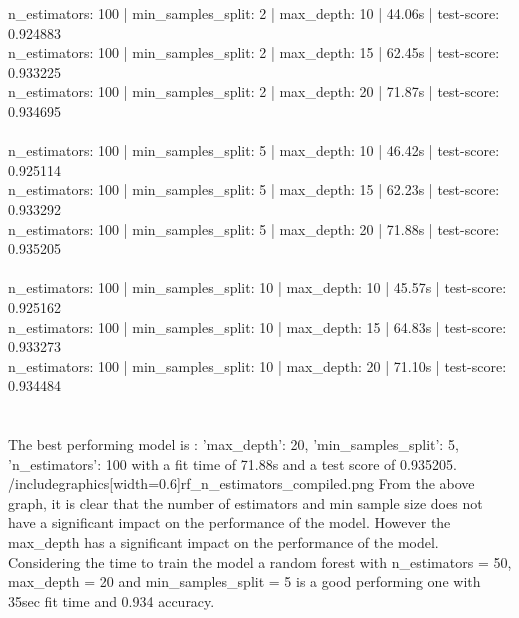 \documentclass[12pt, letterpaper]{article}
\begin{document}
n_estimators: 100 | min_samples_split: 2 | max_depth: 10 | 44.06s | test-score: 0.924883 \\
n_estimators: 100 | min_samples_split: 2 | max_depth: 15 | 62.45s | test-score: 0.933225 \\
n_estimators: 100 | min_samples_split: 2 | max_depth: 20 | 71.87s | test-score: 0.934695 \\ \\
n_estimators: 100 | min_samples_split: 5 | max_depth: 10 | 46.42s | test-score: 0.925114 \\
n_estimators: 100 | min_samples_split: 5 | max_depth: 15 | 62.23s | test-score: 0.933292 \\
n_estimators: 100 | min_samples_split: 5 | max_depth: 20 | 71.88s | test-score: 0.935205 \\ \\
n_estimators: 100 | min_samples_split: 10 | max_depth: 10 | 45.57s | test-score: 0.925162 \\
n_estimators: 100 | min_samples_split: 10 | max_depth: 15 | 64.83s | test-score: 0.933273 \\
n_estimators: 100 | min_samples_split: 10 | max_depth: 20 | 71.10s | test-score: 0.934484 \\ \\ \\

The best performing model is : {'max_depth': 20, 'min_samples_split': 5, 'n_estimators': 100} with a fit time of 71.88s and a test score of 0.935205.
/includegraphics[width=0.6\textwidth]{rf_n_estimators_compiled.png}
From the above graph, it is clear that the number of estimators and min sample size does not have a significant impact on the performance of the model. 
However the max_depth has a significant impact on the performance of the model. \\ 
Considering the time to train the model a random forest with n_estimators = 50, max_depth = 20 and min_samples_split = 5 is a good performing one with 35sec fit time and 0.934 accuracy.
\end{document}
